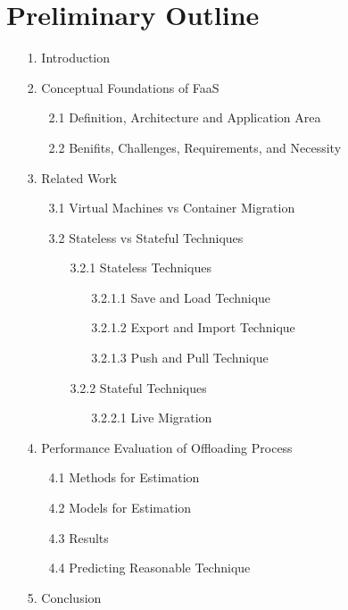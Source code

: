 \section{Preliminary Outline}
\label{sec:preliminary-outline}
\begin{enumerate}
	\item[1.] Introduction
	\item [2.] Conceptual Foundations of FaaS
	\begin{enumerate}
		\item[2.1] Definition, Architecture and Application Area 
		\item[2.2] Benifits, Challenges, Requirements, and Necessity
	\end{enumerate}
	\item[3. ] Related Work
		\begin{enumerate}
			\item[3.1] Virtual Machines vs Container Migration
			\item[3.2] Stateless vs Stateful Techniques
			\begin{enumerate}
				\item[3.2.1] Stateless Techniques
				\begin{enumerate}
					\item[3.2.1.1] Save and Load Technique
					\item[3.2.1.2] Export and Import Technique
					\item[3.2.1.3] Push and Pull Technique
				\end{enumerate}
			    \item[3.2.2] Stateful Techniques
			    	\begin{enumerate}
			   			\item[3.2.2.1] Live Migration
		    		\end{enumerate}  
			\end{enumerate}	
		\end{enumerate}
		\item[4. ] Performance Evaluation of Offloading Process
		\begin{enumerate}
			\item[4.1] Methods for Estimation
			\item[4.2] Models for Estimation 
			\item[4.3] Results 
			\item[4.4] Predicting Reasonable Technique
		\end{enumerate}
	\item[5. ] Conclusion 
\end{enumerate}
%
